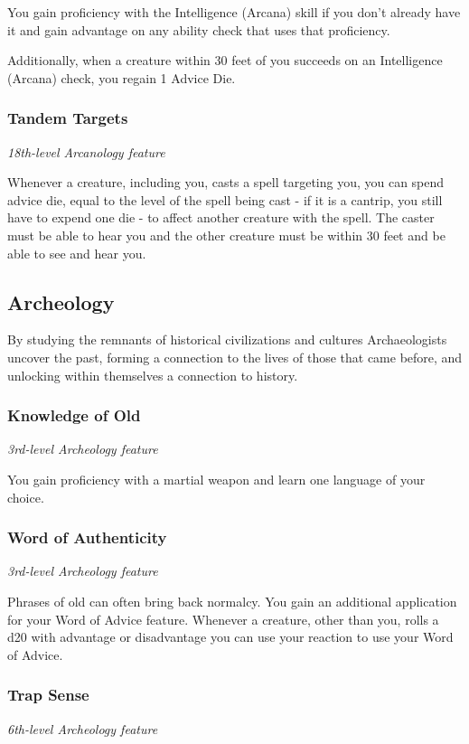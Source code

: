\documentclass[letterpaper,openany,twoside,twocolumn]{book}
\begin{document}
	You gain proficiency with the Intelligence (Arcana) skill if you don’t already have it and gain advantage on any ability check that uses that proficiency.
	
	Additionally, when a creature within 30 feet of you succeeds on an Intelligence (Arcana) check, you regain 1 Advice Die.
	
	\subsubsection*{Tandem Targets}
	\textnormal{\textit{18th-level Arcanology feature}}
	
	Whenever a creature, including you, casts a spell targeting you, you can spend advice die, equal to the level of the spell being cast - if it is a cantrip, you still have to expend one die - to affect another creature with the spell. The caster must be able to hear you and the other creature must be within 30 feet and be able to see and hear you.
	\eject
	
	\subsection*{Archeology}
	By studying the remnants of historical civilizations and cultures Archaeologists uncover the past, forming a connection to the lives of those that came before, and unlocking within themselves a connection to history.
	
	\subsubsection*{Knowledge of Old}
	\textnormal{\textit{3rd-level Archeology feature}}
	
	You gain proficiency with a martial weapon and learn one language of your choice.
	
	\subsubsection*{Word of Authenticity}
	\textnormal{\textit{3rd-level Archeology feature}}
	
	Phrases of old can often bring back normalcy. You gain an additional application for your Word of Advice feature. Whenever a creature, other than you, rolls a d20 with advantage or disadvantage you can use your reaction to use your Word of Advice.
	
	\subsubsection*{Trap Sense}
	\textnormal{\textit{6th-level Archeology feature}}
	
\end{document}
